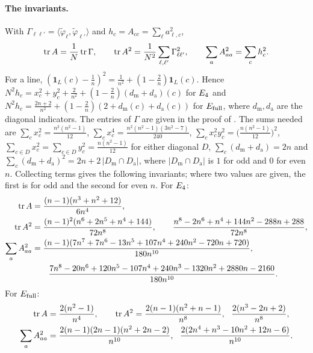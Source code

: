 \paragraph{The invariants.}
With $\Gamma_{\ell\ell'}=\langle\tilde\varphi_\ell,\tilde\varphi_{\ell'}\rangle$ and $h_c=A_{cc}=\sum_\ell a_{\ell,c}^2$,
\[
\operatorname{tr} A=\frac1N\operatorname{tr}\Gamma,\qquad\operatorname{tr} A^2=\frac1{N^2}\sum_{\ell,\ell'}\Gamma_{\ell\ell'}^2,\qquad\sum_aA_{aa}^2=\sum_ch_c^2 .
\]
For a line, $(\mathbf 1_L(c)-\frac1n)^2=\frac1{n^2}+(1-\frac2n)\mathbf 1_L(c)$.
Hence $N^2h_c=x_c^2+y_c^2+\frac2{n^2}+(1-\frac2n)(d_{\mathrm m}+d_{\mathrm a})(c)$ for $E_4$ and $N^2h_c=\frac{2n+2}{n^2}+(1-\frac2n)(2+d_{\mathrm m}(c)+d_{\mathrm a}(c))$ for $E_{\mathrm{full}}$, where $d_{\mathrm m},d_{\mathrm a}$ are the diagonal indicators.
The entries of $\Gamma$ are given in the proof of .
The sums needed are $\sum_cx_c^2=\frac{n^2(n^2-1)}{12}$, $\sum_cx_c^4=\frac{n^2(n^2-1)(3n^2-7)}{240}$, $\sum_cx_c^2y_c^2=\bigl(\frac{n(n^2-1)}{12}\bigr)^2$, $\sum_{c\in D}x_c^2=\sum_{c\in D}y_c^2=\frac{n(n^2-1)}{12}$ for either diagonal $D$, $\sum_c(d_{\mathrm m}+d_{\mathrm a})=2n$ and $\sum_c(d_{\mathrm m}+d_{\mathrm a})^2=2n+2\,|D_{\mathrm m}\cap D_{\mathrm a}|$, where $|D_{\mathrm m}\cap D_{\mathrm a}|$ is $1$ for odd and $0$ for even $n$.
Collecting terms gives the following invariants; where two values are given, the first is for odd and the second for even $n$.
For $E_4$:
\begin{equation}
\begin{aligned}
\operatorname{tr} A&=\frac{(n-1)(n^3+n^2+12)}{6n^4},\\
\operatorname{tr} A^2&=\frac{(n-1)^2(n^6+2n^5+n^4+144)}{72n^8},\qquad\frac{n^8-2n^6+n^4+144n^2-288n+288}{72n^8},\\
\sum_aA_{aa}^2&=\frac{(n-1)(7n^7+7n^6-13n^5+107n^4+240n^2-720n+720)}{180n^{10}},\\
&\qquad\frac{7n^8-20n^6+120n^5-107n^4+240n^3-1320n^2+2880n-2160}{180n^{10}}.
\end{aligned}
\label{eq:inv_low}
\end{equation}
For $E_{\mathrm{full}}$:
\begin{equation}
\begin{aligned}
\tr A&=\frac{2(n^2-1)}{n^4},\qquad
\tr A^2=\frac{2(n-1)(n^2+n-1)}{n^8},\ \ \frac{2(n^3-2n+2)}{n^8},\\
\sum_aA_{aa}^2&=\frac{2(n-1)(2n-1)(n^2+2n-2)}{n^{10}},\ \ \frac{2(2n^4+n^3-10n^2+12n-6)}{n^{10}}.
\end{aligned}
\label{eq:inv_full}
\end{equation}

